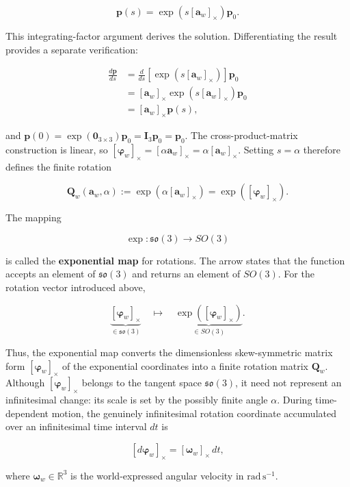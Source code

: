 \documentclass[
  australian,
  12pt,
  letterpaper,
  DIV=11,
  numbers=noendperiod,
  twoside]{scrreprt}
\begin{document}
\[
\boxed{
\mathbf p(s)
=
\exp\!\left(s[\mathbf a_w]_\times\right)\mathbf p_0
}.
\]

This integrating-factor argument derives the solution. Differentiating
the result provides a separate verification:

\[
\begin{aligned}
\frac{d\mathbf p}{ds}
&=
\frac{d}{ds}
\left[
\exp\!\left(s[\mathbf a_w]_\times\right)
\right]
\mathbf p_0\\
&=
[\mathbf a_w]_\times
\exp\!\left(s[\mathbf a_w]_\times\right)
\mathbf p_0\\
&=
[\mathbf a_w]_\times\mathbf p(s),
\end{aligned}
\]

and
\(\mathbf p(0)=\exp(\mathbf 0_{3\times3})\mathbf p_0=\mathbf I_3\mathbf p_0=\mathbf p_0\).
The cross-product-matrix construction is linear, so
\([\boldsymbol\varphi_w]_\times=[\alpha\mathbf a_w]_\times=\alpha[\mathbf a_w]_\times\).
Setting \(s=\alpha\) therefore defines the finite rotation

\[
\boxed{
\mathbf Q_w(\mathbf a_w,\alpha)
\mathrel{:=}
\exp\!\left(\alpha[\mathbf a_w]_\times\right)
=
\exp\!\left([\boldsymbol\varphi_w]_\times\right)
}.
\]

The mapping

\[
\exp:\mathfrak{so}(3)\to SO(3)
\]

is called the \textbf{exponential map} for rotations. The arrow states
that the function accepts an element of \(\mathfrak{so}(3)\) and returns
an element of \(SO(3)\). For the rotation vector introduced above,

\[
\underbrace{
[\boldsymbol\varphi_w]_\times
}_{\in\mathfrak{so}(3)}
\quad\longmapsto\quad
\underbrace{
\exp\!\left([\boldsymbol\varphi_w]_\times\right)
}_{\in SO(3)}.
\]

Thus, the exponential map converts the dimensionless skew-symmetric
matrix form \([\boldsymbol\varphi_w]_\times\) of the exponential
coordinates into a finite rotation matrix \(\mathbf Q_w\). Although
\([\boldsymbol\varphi_w]_\times\) belongs to the tangent space
\(\mathfrak{so}(3)\), it need not represent an infinitesimal change: its
scale is set by the possibly finite angle \(\alpha\). During
time-dependent motion, the genuinely infinitesimal rotation coordinate
accumulated over an infinitesimal time interval \(dt\) is

\[
\boxed{
[d\boldsymbol\varphi_w]_\times
=
[\boldsymbol\omega_w]_\times\,dt
},
\]

where \(\boldsymbol\omega_w\in\mathbb R^3\) is the world-expressed
angular velocity in \(\mathrm{rad\,s^{-1}}\).
\end{document}
